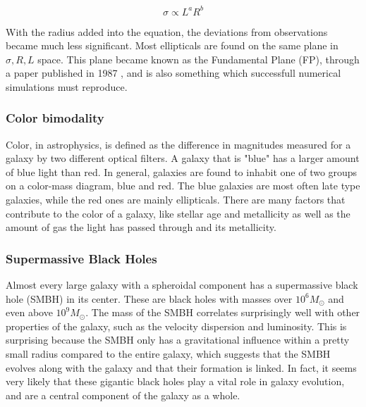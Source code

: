 \begin{equation}
    \sigma \propto L^a R^b
\end{equation}

With the radius added into the equation, the deviations from observations became much less significant. Most ellipticals are found on the same plane in ${\sigma, R, L}$ space. This plane became known as the Fundamental Plane (FP), through a paper published in 1987 \parencite{Djorgovski1987}, and is also something which successfull numerical simulations must reproduce.

\subsubsection{Color bimodality}
Color, in astrophysics, is defined as the difference in magnitudes measured for a galaxy by two different optical filters. A galaxy that is "blue" has a larger amount of blue light than red. In general, galaxies are found to inhabit one of two groups on a color-mass diagram, blue and red. The blue galaxies are most often late type galaxies, while the red ones are mainly ellipticals. There are many factors that contribute to the color of a galaxy, like stellar age and metallicity as well as the amount of gas the light has passed through and its metallicity.

\subsubsection{Supermassive Black Holes}
Almost every large galaxy with a spheroidal component has a supermassive black hole (SMBH) in its center. These are black holes with masses over $10^6 M_{\odot}$ and even above $10^9 M_{\odot}$. The mass of the SMBH correlates surprisingly well with other properties of the galaxy, such as the velocity dispersion and luminosity. This is surprising because the SMBH only has a gravitational influence within a pretty small radius compared to the entire galaxy, which suggests that the SMBH evolves along with the galaxy and that their formation is linked. In fact, it seems very likely that these gigantic black holes play a vital role in galaxy evolution, and are a central component of the galaxy as a whole.